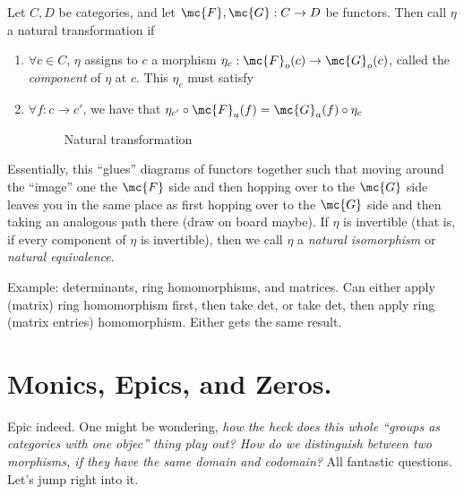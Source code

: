 \documentclass{fkbook}
\theoremstyle{snazzydefinition}
\begin{document}
\begin{definition}
  Let $C,D$ be categories, and let $\mc{F}, \mc{G} : C \to D$ be
  functors. Then call $\eta$ a natural transformation if
  \begin{enumerate}[label=\arabic*)]
    \item $\forall c \in C$, $\eta$ assigns to $c$ a morphism $\eta_c
      : \mc{F}_o(c) \to \mc{G}_o(c)$, called the \emph{component} of
      $\eta$ at $c$. This $\eta_c$ must satisfy
    \item $\forall f : c \to c'$, we have that $\eta_{c'} \circ
      \mc{F}_a(f) = \mc{G}_a(f) \circ \eta_c$
      \begin{figure}[H]
        \centering
        \caption{Natural transformation}
      \end{figure}
  \end{enumerate}
\end{definition}
Essentially, this ``glues'' diagrams of functors together such that
moving around the ``image'' one the $\mc{F}$ side and then hopping
over to the $\mc{G}$ side leaves you in the same place as first
hopping over to the $\mc{G}$ side and then taking an analogous path
there (draw on board maybe). If $\eta$ is invertible (that is, if
every component of $\eta$ is invertible), then we call $\eta$ a
\emph{natural isomorphism} or \emph{natural equivalence}.

Example: determinants, ring homomorphisms, and matrices. Can either
apply (matrix) ring homomorphism first, then take det, or take det,
then apply ring (matrix entries) homomorphism. Either gets the same
result.

\section{Monics, Epics, and Zeros.}
Epic indeed. One might be wondering, \emph{how the heck does this
  whole ``groups as categories with one objec'' thing play out? How do
we distinguish between two morphisms, if they have the same domain and
codomain?} All fantastic questions. Let's jump right into it.
\end{document}

